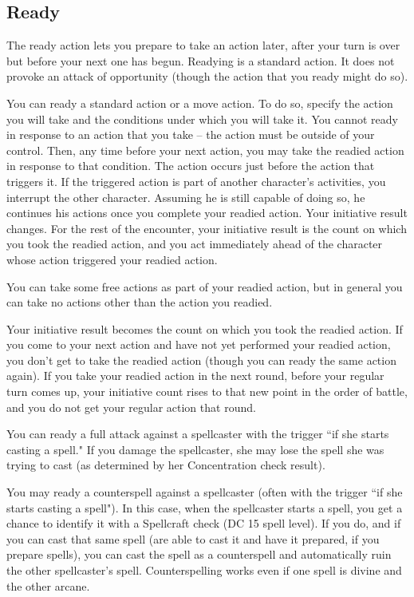 \subsection{Ready}\label{Ready}
The ready action lets you prepare to take an action later, after your turn is over but before your next one has begun. Readying is a standard action. It does not provoke an attack of opportunity (though the action that you ready might do so).

 You can ready a standard action or a move action. To do so, specify the action you will take and the conditions under which you will take it. You cannot ready in response to an action that you take -- the action must be outside of your control. Then, any time before your next action, you may take the readied action in response to that condition. The action occurs just before the action that triggers it. If the triggered action is part of another character's activities, you interrupt the other character. Assuming he is still capable of doing so, he continues his actions once you complete your readied action. Your initiative result changes. For the rest of the encounter, your initiative result is the count on which you took the readied action, and you act immediately ahead of the character whose action triggered your readied action.

You can take some free actions as part of your readied action, but in general you can take no actions other than the action you readied.

 Your initiative result becomes the count on which you took the readied action. If you come to your next action and have not yet performed your readied action, you don't get to take the readied action (though you can ready the same action again). If you take your readied action in the next round, before your regular turn comes up, your initiative count rises to that new point in the order of battle, and you do not get your regular action that round.

 You can ready a full attack against a spellcaster with the trigger ``if she starts casting a spell." If you damage
the spellcaster, she may lose the spell she was trying to cast (as determined by her Concentration check result).

 You may ready a counterspell against a spellcaster (often with the trigger ``if she starts casting a spell"). In this case, when the spellcaster starts a spell, you get a chance to identify it with a Spellcraft check (DC 15 \add spell level). If you do, and if you can cast that same spell (are able to cast it and have it prepared, if you prepare spells), you can cast the spell as a counterspell and automatically ruin the other spellcaster's spell. Counterspelling works even if one spell is divine and the other arcane.

